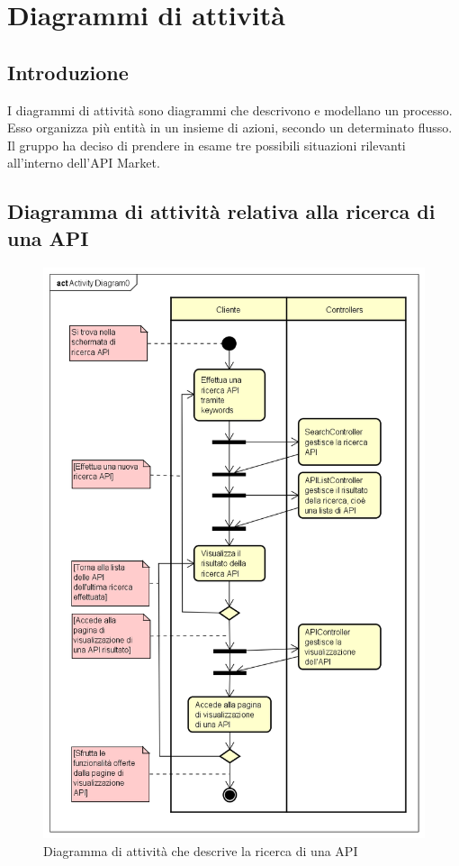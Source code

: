 \newpage
\section{Diagrammi di attività}
\subsection{Introduzione}
I diagrammi di attività sono diagrammi che descrivono e modellano un processo. Esso organizza più entità in un insieme di azioni, secondo un determinato flusso.
Il gruppo ha deciso di prendere in esame tre possibili situazioni rilevanti all'interno dell'API Market.

\subsection{Diagramma di attività relativa alla ricerca di una API}
\begin{figure} [H]
	\centering
	\includegraphics[height=0.9\textheight]{"IMG/att_Ricerca_API"}
	\caption{Diagramma di attività che descrive la ricerca di una API}
\end{figure}
